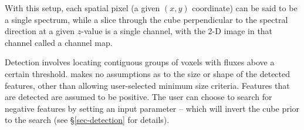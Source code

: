 With this setup, each spatial pixel (a given $(x,y)$ coordinate) can
be said to be a single spectrum, while a slice through the cube
perpendicular to the spectral direction at a given $z$-value is a
single channel, with the 2-D image in that channel called a channel
map.

Detection involves locating contiguous groups of voxels with fluxes
above a certain threshold. \duchamp makes no assumptions as to the
size or shape of the detected features, other than allowing
user-selected minimum size criteria. Features that are detected are
assumed to be positive. The user can choose to search for negative
features by setting an input parameter -- which will invert the cube
prior to the search (see \S\ref{sec-detection} for details).


